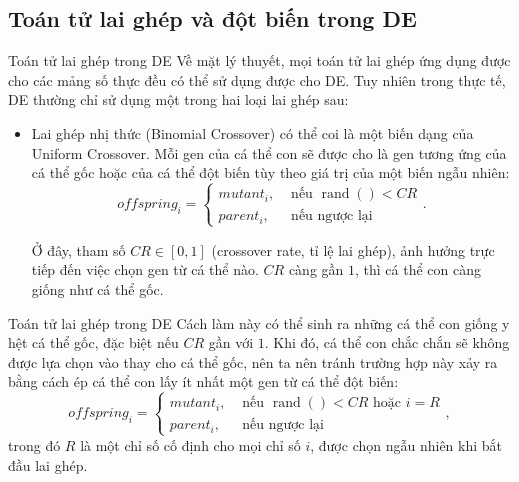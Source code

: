 
\subsection{Toán tử lai ghép và đột biến trong DE} %
\label{sub:Toán tử lai ghép và đột biến trong DE}

\begin{frame}{Toán tử lai ghép trong DE}
Về mặt lý thuyết, mọi toán tử lai ghép ứng dụng được cho các mảng số thực đều có
thể sử dụng được cho DE. Tuy nhiên trong thực tế, DE thường chỉ sử dụng một
trong hai loại lai ghép sau:
\begin{itemize}
\item Lai ghép nhị thức (Binomial Crossover) có thể coi là một biến dạng của Uniform
  Crossover. Mỗi gen của cá thể con sẽ được cho là gen tương ứng của cá thể gốc
  hoặc của cá thể đột biến tùy theo giá trị của một biến ngẫu nhiên:
  \[
    offspring_{i} = \begin{cases}
      mutant_{i}, &\text{ nếu } \operatorname{rand}() < CR\\
      parent_{i}, &\text{ nếu ngược lại }
      
    \end{cases}
  .\] 

  Ở đây, tham số \( CR \in [0, 1] \) (crossover rate, tỉ lệ lai ghép), ảnh hưởng
  trực tiếp đến việc chọn gen từ cá thể nào. \( CR \) càng gần \( 1 \), thì cá
  thể con càng giống như cá thể gốc.
\end{itemize}
\end{frame}

\begin{frame}{Toán tử lai ghép trong DE}
Cách làm này có thể sinh ra những cá thể con giống y hệt cá thể gốc, đặc biệt
nếu \( CR \) gần với \( 1 \). Khi đó, cá thể con chắc chắn sẽ không được lựa
chọn vào thay cho cá thể gốc, nên ta nên tránh trường hợp này xảy ra bằng cách
ép cá thể con lấy ít nhất một gen từ cá thể đột biến:
  \[
    offspring_{i} = \begin{cases}
      mutant_{i}, &\text{ nếu } \operatorname{rand}() < CR \text{ hoặc } i = R\\
      parent_{i}, &\text{ nếu ngược lại }
      
    \end{cases}
  ,\] 
  trong đó \( R \) là một chỉ số cố định cho mọi chỉ số \( i \), được chọn ngẫu
  nhiên khi bắt đầu lai ghép.
\end{frame}

